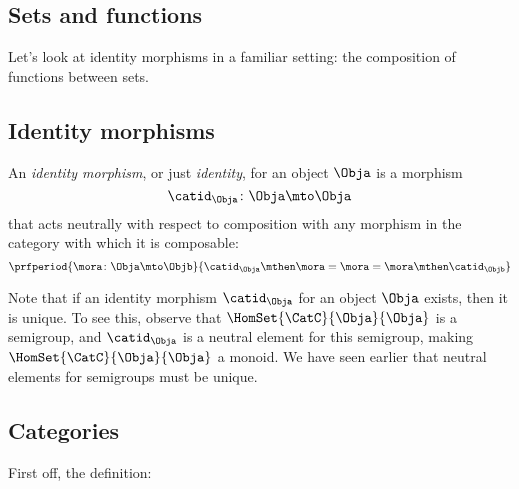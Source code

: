 \subsection{Sets and functions}

Let's look at identity morphisms in a familiar setting: the composition of functions between sets.

\subsection{Identity morphisms}

\begin{ctdefinition}
    \label{def:identity-morphism}
    An \emph{identity morphism}, or just \emph{identity}, for an object $\Obja$
    is a morphism
    \begin{equation}
        \catid_{\Obja}\colon \Obja \mto \Obja
    \end{equation}
    that acts neutrally with respect to composition with any morphism in the category with which it is composable:
    \begin{equation}
        \prfperiod{
            \mora \colon \Obja \mto \Objb
        }{
            \catid_\Obja \mthen \mora= \mora = \mora \mthen \catid_\Objb
        }
    \end{equation}
\end{ctdefinition}

Note that if an identity morphism $\catid_{\Obja}$ for an object $\Obja$ exists, then it is unique.
To see this, observe that $\HomSet{\CatC}{\Obja}{\Obja}$ is a semigroup, and $\catid_{\Obja}$ is a neutral element for this semigroup, making $\HomSet{\CatC}{\Obja}{\Obja}$ a monoid.
We have seen earlier that neutral elements for semigroups must be unique.

\subsection{Categories}

First off, the definition:

